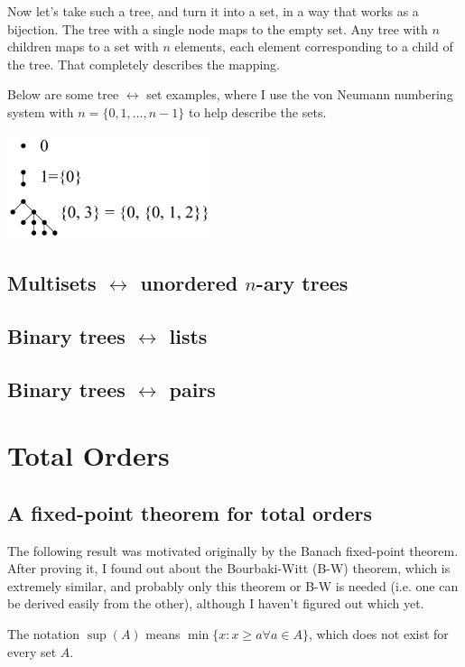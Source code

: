 \documentclass[11pt]{amsart}
\begin{document}
Now let's take such a tree, and turn it into a set, in a way that works as
a bijection. The tree with a single node maps to the empty set.
Any tree with $n$ children maps to a set with $n$ elements, each element
corresponding to a child of the tree. That completely describes the
mapping.

Below are some tree $\leftrightarrow$ set examples, where I use the von Neumann numbering
system with $n = \{0, 1, \ldots, n-1\}$ to help describe the sets.

\centerline{
\includegraphics[width=6.0cm]{set_theory_ideas2.pdf}
}

\subsection{Multisets $\leftrightarrow$ unordered $n$-ary trees}

\subsection{Binary trees $\leftrightarrow$ lists}

\subsection{Binary trees $\leftrightarrow$ pairs}

\section{Total Orders}

\subsection{A fixed-point theorem for total orders}

The following result was motivated originally by the
Banach fixed-point theorem. After proving it, I found out
about the Bourbaki-Witt (B-W) theorem, which is extremely similar,
and probably only this theorem or B-W is needed (i.e. one can be
derived easily from the other), although I haven't figured out which yet.

The notation $\sup (A)$ means $\min \{x : x \ge a \forall a \in A\}$,
which does not exist for every set $A$.
\end{document}
